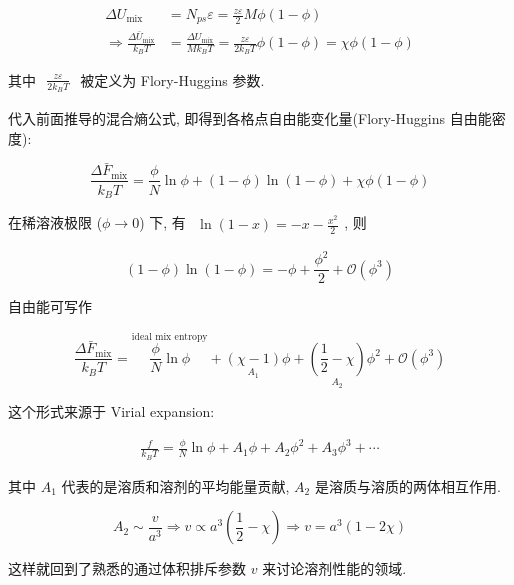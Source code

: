 \documentclass[../../main.tex]{subfiles}
\begin{document}
\begin{enumerate}
{{$$
\begin{aligned}
\Delta U_{\text{mix}} &= N_{ps}\varepsilon = \frac{z\varepsilon}{2}M\phi(1-\phi) \\
\Rightarrow \frac{\Delta\bar{U}_{\text{mix}}}{k_{B}T} &= \frac{\Delta U_{\text{mix}}}{Mk_{B}T} = \frac{z\varepsilon}{2k_{B}T} \phi (1-\phi) = \chi\phi(1-\phi)
\end{aligned}
$$

其中 $\begin{aligned}\frac{z\varepsilon}{2k_{B}T}\end{aligned}$ 被定义为 Flory-Huggins 参数. 

代入前面推导的混合熵公式, 即得到各格点自由能变化量(Flory-Huggins 自由能密度):

$$
\boxed{\frac{\Delta\bar{F}_{\text{mix}}}{k_{B}T} = \frac{\phi}{N}\ln{\phi} + (1-\phi)\ln{(1-\phi)} + \chi\phi(1-\phi)}
$$

在稀溶液极限 ($\phi\to 0$) 下, 有 $\begin{aligned}\ln{(1-x)} = - x - \frac{x^{2}}{2}\end{aligned}$, 则

$$
(1-\phi)\ln{(1-\phi)} = -\phi + \frac{\phi^{2}}{2} + \mathcal{O}(\phi^{3})
$$

自由能可写作

$$
\frac{\Delta\bar{F}_{\text{mix}}}{k_{B}T} = \overset{\text{ideal mix entropy}}{\frac{\phi}{N}\ln{\phi}} + \underset{A_{1}}{(\chi-1)}\phi + \underset{A_{2}}{\left(\frac{1}{2}-\chi\right)}\phi^{2} + \mathcal{O}(\phi^{3})
$$

这个形式来源于 Virial expansion: 

$$
\begin{aligned}
\frac{f}{k_{B}T} = \frac{\phi}{N}\ln{\phi} + A_{1}\phi + A_{2}\phi^{2} + A_{3}\phi^{3} + \cdots
\end{aligned}
$$

其中 $A_{1}$ 代表的是溶质和溶剂的平均能量贡献, $A_{2}$ 是溶质与溶质的两体相互作用. 

$$
A_{2}\sim \frac{v}{a^{3}}\Rightarrow v\propto a^{3}\left(\frac{1}{2}-\chi\right) \Rightarrow v = a^{3}(1-2\chi)
$$

这样就回到了熟悉的通过体积排斥参数 $v$ 来讨论溶剂性能的领域. 

}}
\end{enumerate}
\end{document}
